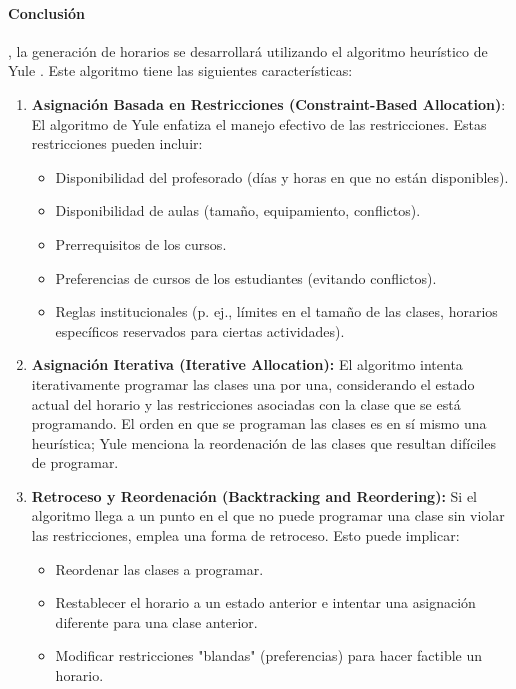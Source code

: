\paragraph{Conclusión}
, la generación de horarios se desarrollará utilizando el algoritmo heurístico de Yule \cite{Yule1969}.
Este algoritmo tiene las siguientes características:

\begin{enumerate}[label=\alph*.]
    \item \textbf{Asignación Basada en Restricciones (Constraint-Based Allocation)}: El algoritmo de Yule enfatiza el manejo efectivo de las restricciones.
	Estas restricciones pueden incluir:
    \begin{itemize}
        \item Disponibilidad del profesorado (días y horas en que no están disponibles).
        \item Disponibilidad de aulas (tamaño, equipamiento, conflictos).
        \item Prerrequisitos de los cursos.
        \item Preferencias de cursos de los estudiantes (evitando conflictos).
        \item Reglas institucionales (p. ej., límites en el tamaño de las clases, horarios específicos reservados para ciertas actividades).
    \end{itemize}

    \item \textbf{Asignación Iterativa (Iterative Allocation):} El algoritmo intenta iterativamente programar las clases una por una, considerando el estado actual del horario y las restricciones asociadas con la clase que se está programando.
	El orden en que se programan las clases es en sí mismo una heurística; Yule menciona la reordenación de las clases que resultan difíciles de programar.

    \item \textbf{Retroceso y Reordenación (Backtracking and Reordering):} Si el algoritmo llega a un punto en el que no puede programar una clase sin violar las restricciones, emplea una forma de retroceso.
	Esto puede implicar:
    \begin{itemize}
        \item Reordenar las clases a programar.
        \item Restablecer el horario a un estado anterior e intentar una asignación diferente para una clase anterior.
        \item Modificar restricciones "blandas" (preferencias) para hacer factible un horario.
    \end{itemize}


\end{enumerate}
